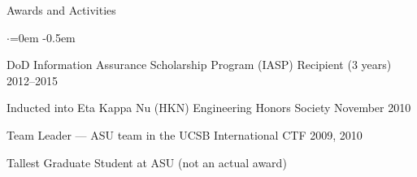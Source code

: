 \documentclass{resume} %
\begin{document}

\begin{rSection}{Awards and Activities}

\begin{list}{$\cdot$}{\leftmargin=0em} %
   \itemsep -0.5em
	
	\item DoD Information Assurance Scholarship Program (IASP) Recipient (3 years) \hfill 2012--2015

	\item Inducted into Eta Kappa Nu (HKN) Engineering Honors Society \hfill November 2010
	
	\item Team Leader --- ASU team in the UCSB International CTF \hfill 2009, 2010
	
	\item Tallest Graduate Student at ASU \hfill (not an actual award)

\end{list}

\end{rSection}





\end{document}
